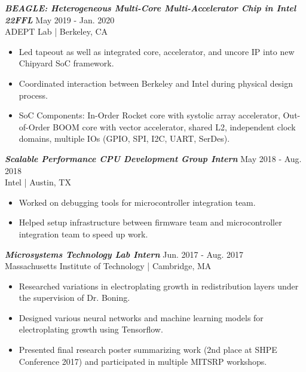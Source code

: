 \documentclass[letter]{res}
\begin{document}
\begin{resume}
{\sl \textbf{BEAGLE: Heterogeneous Multi-Core Multi-Accelerator Chip in Intel 22FFL}} \hfill May 2019 - Jan. 2020\\
ADEPT Lab | Berkeley, CA \newline

 \vspace{-4mm}

 \begin{itemize}
 \item Led tapeout as well as integrated core, accelerator, and uncore IP into new Chipyard SoC framework.
 \item Coordinated interaction between Berkeley and Intel during physical design process.
 \item SoC Components: In-Order Rocket core with systolic array accelerator, Out-of-Order BOOM core with vector accelerator, shared L2, independent clock domains, multiple IOs (GPIO, SPI, I2C, UART, SerDes).
 \end{itemize}

\vspace{-2mm}

{\sl \textbf{Scalable Performance CPU Development Group Intern}} \hfill May 2018 - Aug. 2018\\
Intel | Austin, TX \newline

 \vspace{-4mm}

 \begin{itemize}
 \item Worked on debugging tools for microcontroller integration team.
 \item Helped setup infrastructure between firmware team and microcontroller integration team to speed up work.
 \end{itemize}

\vspace{-2mm}

{\sl \textbf{Microsystems Technology Lab Intern}} \hfill Jun. 2017 - Aug. 2017\\
Massachusetts Institute of Technology | Cambridge, MA \newline

 \vspace{-4mm}

 \begin{itemize}
 \item Researched variations in electroplating growth in redistribution layers under the supervision of Dr. Boning.
 \item Designed various neural networks and machine learning models for electroplating growth using Tensorflow.
 \item Presented final research poster summarizing work (2nd place at SHPE Conference 2017) and participated in multiple MITSRP workshops.
 \end{itemize}


\end{resume}
\end{document}
